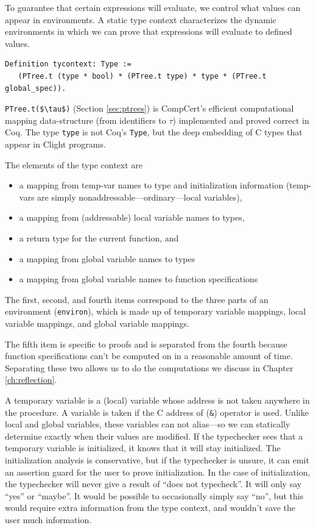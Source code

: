 \documentclass{puthesis}
\begin{document}
To guarantee that certain expressions will evaluate, we control what
values can appear in environments. A static type context characterizes
the dynamic environments in which we can prove that expressions will
evaluate to defined values.

\begin{lstlisting}
Definition tycontext: Type :=
   (PTree.t (type * bool) * (PTree.t type) * type * (PTree.t global_spec)).
\end{lstlisting}
\lstinline|PTree.t($\tau$)| (Section \ref{sec:ptrees}) is CompCert's efficient computational mapping
data-structure (from identifiers to $\tau$) implemented and proved
correct in Coq. The type
\lstinline|type| is not Coq's \lstinline|Type|, but the deep embedding
of C types that appear in Clight programs.

The elements of the type context are
\begin{itemize}
  \item a mapping from temp-var names to type and initialization
  information (temp-vars are simply nonaddressable---ordinary---local variables),
  \item a mapping from (addressable) local variable names to types,
  \item a return type for the current function, and
  \item a mapping from global variable names to types
  \item a mapping from global variable names to function specifications
\end{itemize}

The first, second, and fourth items correspond to the three parts of
an environment (\lstinline|environ|), which is made up of temporary
variable mappings, local variable mappings, and global variable
mappings.

The fifth item is specific to proofs and is separated from the fourth
because function specifications can't be computed on in a reasonable
amount of time. Separating these two allows us to do the computations
we discuss in Chapter \ref{ch:reflection}. 

A temporary variable is a (local) variable whose address is not taken
anywhere in the procedure. A variable is taken if the C address of
(\lstinline|&|) operator is used. Unlike local and global variables, these
variables can not alias---so we can statically determine exactly when
their values are modified. If the typechecker sees that a temporary
variable is initialized, it knows that it will stay initialized. The
initialization analysis is conservative, but if the typechecker is
unsure, it can emit an assertion guard for the user to prove
initialization. In the case of initialization, the typechecker will
never give a result of ``does not typecheck''. It will only say
``yes'' or ``maybe''. It would be possible to occasionally simply say
``no'', but this would require extra information from the type
context, and wouldn't save the user much information. 
\end{document}
